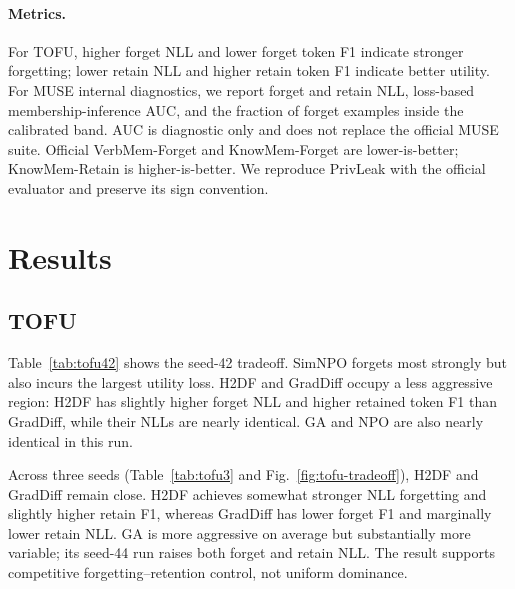 \documentclass[10pt,twocolumn]{article}
\newcommand{\method}{\textsc{H2DF}}
\begin{document}
\paragraph{Metrics.}
For TOFU, higher forget NLL and lower forget token F1 indicate stronger
forgetting; lower retain NLL and higher retain token F1 indicate better utility.
For MUSE internal diagnostics, we report forget and retain NLL, loss-based
membership-inference AUC, and the fraction of forget examples inside the
calibrated band. AUC is diagnostic only and does not replace the official MUSE
suite. Official VerbMem-Forget and KnowMem-Forget are lower-is-better;
KnowMem-Retain is higher-is-better. We reproduce PrivLeak with the official
evaluator and preserve its sign convention.

\section{Results}
\label{sec:results}

\subsection{TOFU}

Table~\ref{tab:tofu42} shows the seed-42 tradeoff. SimNPO forgets most strongly
but also incurs the largest utility loss. \method{} and GradDiff occupy a less
aggressive region: \method{} has slightly higher forget NLL and higher retained
token F1 than GradDiff, while their NLLs are nearly identical. GA and NPO are
also nearly identical in this run.

Across three seeds (Table~\ref{tab:tofu3} and Fig.~\ref{fig:tofu-tradeoff}),
\method{} and GradDiff remain close. \method{} achieves somewhat stronger NLL
forgetting and slightly higher retain F1, whereas GradDiff has lower forget F1
and marginally lower retain NLL. GA is more aggressive on average but
substantially more variable; its seed-44 run raises both forget and retain NLL.
The result supports competitive forgetting--retention control, not uniform
dominance.
\end{document}
